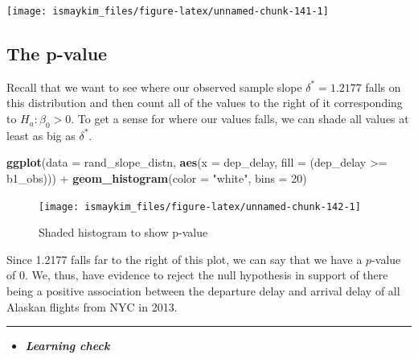\documentclass[]{tufte-book}
\newenvironment{Shaded}{\begin{snugshade}}{\end{snugshade}}
\newcommand{\KeywordTok}[1]{\textcolor[rgb]{0.13,0.29,0.53}{\textbf{{#1}}}}
\newcommand{\DataTypeTok}[1]{\textcolor[rgb]{0.13,0.29,0.53}{{#1}}}
\newcommand{\DecValTok}[1]{\textcolor[rgb]{0.00,0.00,0.81}{{#1}}}
\newcommand{\StringTok}[1]{\textcolor[rgb]{0.31,0.60,0.02}{{#1}}}
\newcommand{\NormalTok}[1]{{#1}}
\let\oldrule=\rule
\renewcommand{\rule}[1]{\oldrule{\linewidth}}
\newenvironment{rmdblock}[1]
  {\begin{shaded*}
  \begin{itemize}
  \renewcommand{\labelitemi}{
    \raisebox{-.7\height}[0pt][0pt]{
    }
  }
  \item
  }
  {
  \end{itemize}
  \end{shaded*}
  }
\newenvironment{learncheck}
  {\begin{rmdblock}{warning}}
  {\end{rmdblock}}
\theoremstyle{definition}
\theoremstyle{definition}
\theoremstyle{remark}
\begin{document}
\begin{center}\texttt{[image: ismaykim\_files/figure-latex/unnamed-chunk-141-1]} \end{center}

\subsection{The p-value}\label{the-p-value-2}

Recall that we want to see where our observed sample slope
\(\delta^* = 1.2177\) falls on this distribution and then count all of
the values to the right of it corresponding to \(H_a: \beta_0 > 0\). To
get a sense for where our values falls, we can shade all values at least
as big as \(\delta^*\).

\begin{Shaded}
\begin{Highlighting}[]
\KeywordTok{ggplot}\NormalTok{(}\DataTypeTok{data =} \NormalTok{rand_slope_distn, }\KeywordTok{aes}\NormalTok{(}\DataTypeTok{x =} \NormalTok{dep_delay, }\DataTypeTok{fill =} \NormalTok{(dep_delay >=}\StringTok{ }\NormalTok{b1_obs))) +}
\StringTok{  }\KeywordTok{geom_histogram}\NormalTok{(}\DataTypeTok{color =} \StringTok{"white"}\NormalTok{, }\DataTypeTok{bins =} \DecValTok{20}\NormalTok{)}
\end{Highlighting}
\end{Shaded}

\begin{figure}

{\centering \texttt{[image: ismaykim\_files/figure-latex/unnamed-chunk-142-1]} 

}

\caption[Shaded histogram to show p-value]{Shaded histogram to show p-value}\label{fig:unnamed-chunk-142}
\end{figure}

Since 1.2177 falls far to the right of this plot, we can say that we
have a \(p\)-value of 0. We, thus, have evidence to reject the null
hypothesis in support of there being a positive association between the
departure delay and arrival delay of all Alaskan flights from NYC in
2013.

\begin{center}\rule{0.5\linewidth}{\linethickness}\end{center}

\begin{learncheck}
\textbf{\emph{Learning check}}
\end{learncheck}
\end{document}
